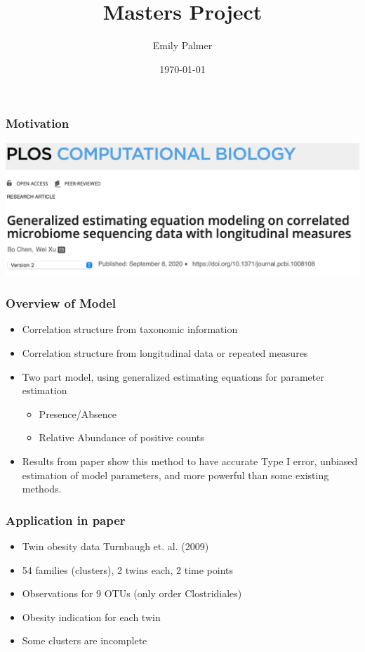 \documentclass{beamer}
\title[Short title]{Masters Project} %
\author{Emily Palmer} %
\institute[OSU] %
{
Group Meeting, Oregon State University  %
}
\date{\today} %
\begin{document}
\begin{frame}
\titlepage %
\end{frame}


\begin{frame}
  \frametitle{Motivation}
  \includegraphics[width = \textwidth]{title.png}
\end{frame}

\begin{frame}
  \frametitle{Overview of Model}
  \begin{itemize}
    \item Correlation structure from taxonomic information
    \item Correlation structure from longitudinal data or repeated measures
    \item Two part model, using generalized estimating equations for parameter estimation
    \begin{itemize}
      \item Presence/Absence
      \item Relative Abundance of positive counts
    \end{itemize}
    \item Results from paper show this method to have accurate Type I error, unbiased estimation of model parameters, and more powerful than some existing methods.
  \end{itemize}
\end{frame}

\begin{frame}
  \frametitle{Application in paper}
  \begin{itemize}
    \item Twin obesity data Turnbaugh et. al. (2009)
    \item 54 families (clusters), 2 twins each, 2 time points
    \item Observations for 9 OTUs (only order Clostridiales)
    \item Obesity indication for each twin
    \item Some clusters are incomplete
  \end{itemize}
\end{frame}
\end{document}
